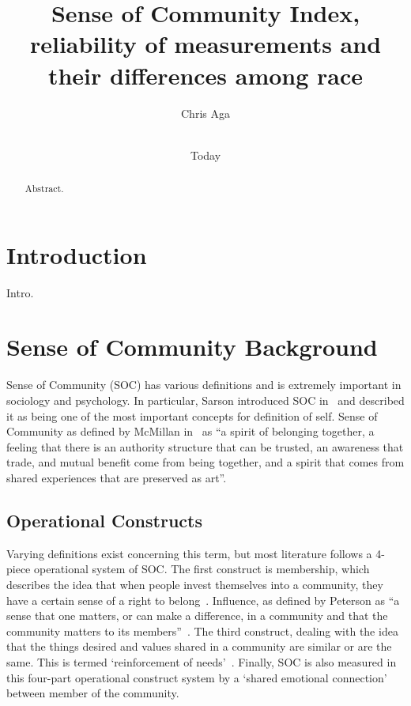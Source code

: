 \documentclass{sig-alternate}
\begin{document}
\title{Sense of Community Index, reliability of measurements and their differences among race}
\author{
\alignauthor
Chris Aga \\
 \\
}

\date{Today}

\maketitle


\begin{abstract}
Abstract.
\end{abstract}

\keywords{}

\section{Introduction}
Intro.

\section{Sense of Community Background}
Sense of Community (SOC) has various definitions and is extremely important in sociology and psychology. In particular, Sarson introduced SOC in~\cite{sarason:1974} and described it as being one of the most important concepts for definition of self. Sense of Community as defined by McMillan in~\cite{senseOfCommunity:1996} as ``a spirit of belonging together, a feeling that there is an authority structure that can be trusted, an awareness that trade, and mutual benefit come from being together, and a spirit that comes from shared experiences that are preserved as art''. 
\subsection{Operational Constructs}
Varying definitions exist concerning this term, but most literature follows a 4-piece operational system of SOC. The first construct is membership, which describes the idea that when people invest themselves into a community, they have a certain sense of a right to belong~\cite{definition:1986}. Influence, as defined by Peterson as ``a sense that one matters, or can make a difference, in a
community and that the community matters to its members''~\cite{fourFactor:2008}. The third construct, dealing with the idea that the things desired and values shared in a community are similar or are the same. This is termed `reinforcement of needs'~\cite{disparities:2009}. Finally, SOC is also measured in this four-part operational construct system by a `shared emotional connection' between member of the community. 
\end{document}
